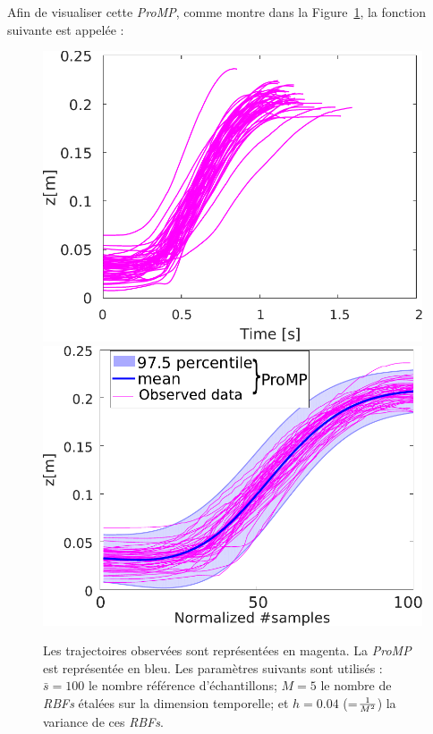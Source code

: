 \documentclass[utf8]{frontiersSCNS} %
\newcommand{\todo}[1]{\textcolor{red}{\textbf{/*#1*/}}}
\begin{document}
Afin de visualiser cette \textit{ProMP}, comme montre dans la Figure~\ref{fig:1DOFtrajectoriesProMP}, la fonction suivante est appelée :

\begin{figure}[h]
\includegraphics[width=\hsize /2]{img/1DOFtrajectoriesV2.pdf} \includegraphics[width=\hsize /2]{img/1DOFtrajectoriesProMPV2.pdf}
\caption{Les trajectoires observées sont représentées en magenta. La \textit{ProMP} est représentée en bleu. Les paramètres suivants sont utilisés : $\bar{s}=100$ le nombre référence d'échantillons; $M=5$ le nombre de \textit{RBFs} étalées sur la dimension temporelle; et $h=0.04$ (=$ 1 \over M^2$) la variance de ces \textit{RBFs}.}
\label{fig:1DOFtrajectoriesProMP}
\end{figure}
\end{document}
